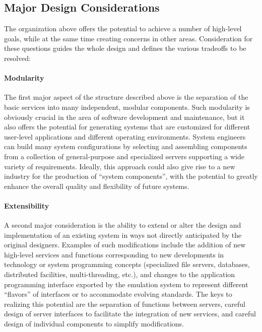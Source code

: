 \subsection{Major Design Considerations}

The organization above offers the potential to achieve a number of
high-level goals, while at the same time creating concerns in other
areas. Consideration for these questions guides the whole design and
defines the various tradeoffs to be resolved:

\paragraph{Modularity}
The first major aspect of the structure described above is the
separation of the basic services into many independent, modular
components. Such modularity is obviously crucial in the area of
software development and maintenance, but it also offers the potential
for generating systems that are customized for different user-level
applications and different operating environments. System engineers
can build many system configurations by selecting and assembling
components from a collection of general-purpose and specialized
servers supporting a wide variety of requirements. Ideally, this
approach could also give rise to a new industry for the production of
``system components'', with the potential to greatly enhance the
overall quality and flexibility of future systems.


\paragraph{Extensibility}
A second major consideration is the ability to extend or alter the
design and implementation of an existing system in ways not directly
anticipated by the original designers. Examples of such modifications
include the addition of new high-level services and functions
corresponding to new developments in technology or system programming
concepts (specialized file servers, databases, distributed facilities,
multi-threading, etc.), and changes to the application programming
interface exported by the emulation system to represent different
``flavors'' of interfaces or to accommodate evolving standards. The
keys to realizing this potential are the separation of functions
between servers, careful design of server interfaces to facilitate the
integration of new services, and careful design of individual
components to simplify modifications.

